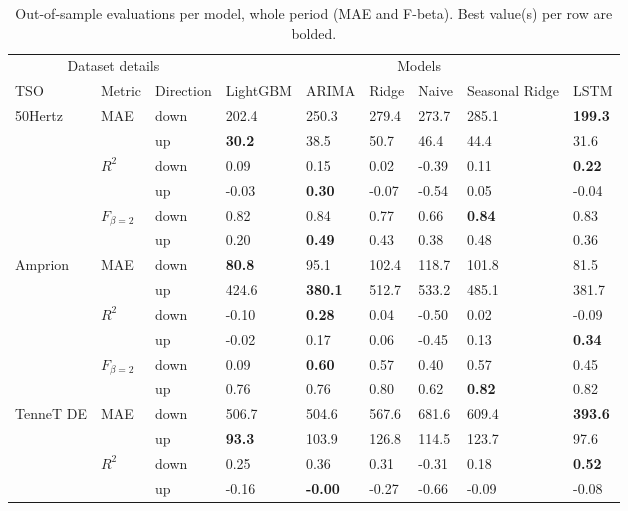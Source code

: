 \begin{table}
\caption{Out-of-sample evaluations per model, whole period (MAE and F-beta). Best value(s) per row are bolded.}
\begin{tabular}{lllllllll}
\toprule
\multicolumn{3}{c}{Dataset details} & \multicolumn{6}{c}{Models} \\
\cmidrule(lr){1-3}\cmidrule(lr){4-9}
TSO & Metric & Direction & LightGBM & ARIMA & Ridge & Naive & Seasonal Ridge & LSTM \\
\midrule
\multirow[t]{6}{*}{50Hertz} & \multirow[t]{2}{*}{MAE} & down & 202.4 & 250.3 & 279.4 & 273.7 & 285.1 & \textbf{199.3} \\
 &  & up & \textbf{30.2} & 38.5 & 50.7 & 46.4 & 44.4 & 31.6 \\
\cline{2-9}
 & \multirow[t]{2}{*}{$R^2$} & down & 0.09 & 0.15 & 0.02 & -0.39 & 0.11 & \textbf{0.22} \\
 &  & up & -0.03 & \textbf{0.30} & -0.07 & -0.54 & 0.05 & -0.04 \\
\cline{2-9}
 & \multirow[t]{2}{*}{$F_{\beta=2}$} & down & 0.82 & 0.84 & 0.77 & 0.66 & \textbf{0.84} & 0.83 \\
 &  & up & 0.20 & \textbf{0.49} & 0.43 & 0.38 & 0.48 & 0.36 \\
\cline{1-9} \cline{2-9}
\multirow[t]{6}{*}{Amprion} & \multirow[t]{2}{*}{MAE} & down & \textbf{80.8} & 95.1 & 102.4 & 118.7 & 101.8 & 81.5 \\
 &  & up & 424.6 & \textbf{380.1} & 512.7 & 533.2 & 485.1 & 381.7 \\
\cline{2-9}
 & \multirow[t]{2}{*}{$R^2$} & down & -0.10 & \textbf{0.28} & 0.04 & -0.50 & 0.02 & -0.09 \\
 &  & up & -0.02 & 0.17 & 0.06 & -0.45 & 0.13 & \textbf{0.34} \\
\cline{2-9}
 & \multirow[t]{2}{*}{$F_{\beta=2}$} & down & 0.09 & \textbf{0.60} & 0.57 & 0.40 & 0.57 & 0.45 \\
 &  & up & 0.76 & 0.76 & 0.80 & 0.62 & \textbf{0.82} & 0.82 \\
\cline{1-9} \cline{2-9}
\multirow[t]{6}{*}{TenneT DE} & \multirow[t]{2}{*}{MAE} & down & 506.7 & 504.6 & 567.6 & 681.6 & 609.4 & \textbf{393.6} \\
 &  & up & \textbf{93.3} & 103.9 & 126.8 & 114.5 & 123.7 & 97.6 \\
\cline{2-9}
 & \multirow[t]{2}{*}{$R^2$} & down & 0.25 & 0.36 & 0.31 & -0.31 & 0.18 & \textbf{0.52} \\
 &  & up & -0.16 & \textbf{-0.00} & -0.27 & -0.66 & -0.09 & -0.08 \\

\end{tabular}
\end{table}
